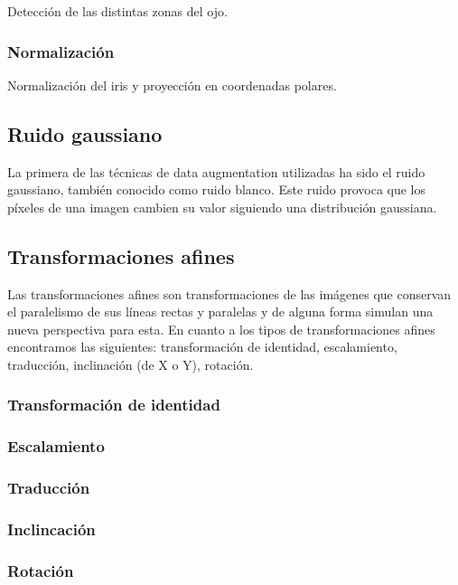 Detección de las distintas zonas del ojo.

\subsubsection{Normalización}

Normalización del iris y proyección en coordenadas polares.

\subsection{Ruido gaussiano}

La primera de las técnicas de data augmentation utilizadas ha sido el ruido gaussiano, también conocido como ruido blanco. Este ruido provoca que los píxeles de una imagen cambien
su valor siguiendo una distribución gaussiana.

\subsection{Transformaciones afines}

Las transformaciones afines son transformaciones de las imágenes que conservan el paralelismo de sus líneas rectas y paralelas y de alguna forma simulan una nueva perspectiva para esta.
En cuanto a los tipos de transformaciones afines encontramos las siguientes: transformación de identidad, escalamiento, traducción, inclinación (de X o Y), rotación.

\subsubsection{Transformación de identidad}

\subsubsection{Escalamiento}

\subsubsection{Traducción}

\subsubsection{Inclincación}

\subsubsection{Rotación}

